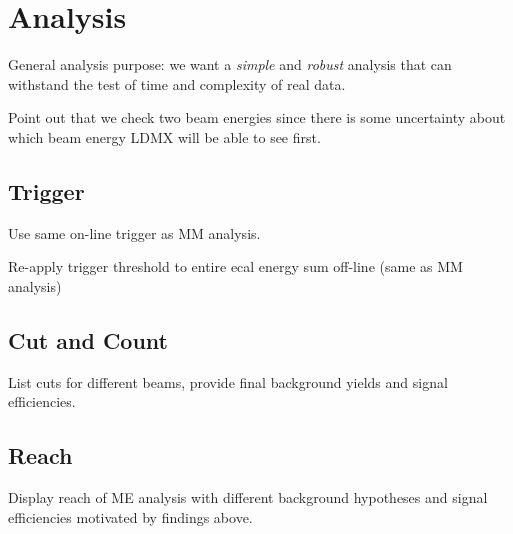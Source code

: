 \chapter{Analysis}
\label{chapter:ldmx:analysis}

General analysis purpose: we want a \emph{simple} and \emph{robust} analysis that can withstand the test of time and complexity of real data.

Point out that we check two beam energies since there is some uncertainty about which
beam energy LDMX will be able to see first.

\section{Trigger}
Use same on-line trigger as MM analysis.

Re-apply trigger threshold to entire ecal energy sum off-line (same as MM analysis)

\section{Cut and Count}
List cuts for different beams, provide final background yields and signal efficiencies.

\section{Reach}
Display reach of ME analysis with different background hypotheses and signal efficiencies
motivated by findings above.

